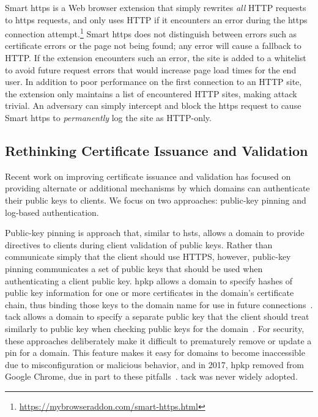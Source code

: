 Smart \ac{https} is a Web browser extension that simply rewrites \emph{all} HTTP
requests to \ac{https} requests, and only uses HTTP if it encounters an error
during the \ac{https} connection
attempt.\footnote{\url{https://mybrowseraddon.com/smart-https.html}} Smart
\ac{https} does not distinguish between errors such as certificate errors or the
page not being found; any error will cause a fallback to HTTP. If the extension
encounters such an error, the site is added to a whitelist to avoid future
request errors that would increase page load times for the end user. In addition
to poor performance on the first connection to an HTTP site, the extension only
maintains a list of encountered HTTP sites, making  attack trivial. An
adversary can simply intercept and block the \ac{https} request to cause Smart
\ac{https} to \emph{permanently} log the site as HTTP-only.

\subsection{Rethinking Certificate Issuance and Validation}

Recent work on improving certificate issuance and validation has focused on
providing alternate or additional mechanisms by which domains can authenticate
their public keys to clients. We focus on two approaches: public-key pinning and
log-based authentication.

Public-key pinning is  approach that, similar to \ac{hsts}, allows a
domain to provide directives to clients during client validation of public keys.
Rather than communicate simply that the client should use HTTPS, however,
public-key pinning communicates a set of public keys that should be used when
authenticating a client public key. \ac{hpkp} allows a domain to specify hashes
of public key information for one or more certificates in the domain's
certificate chain, thus binding those keys to the domain name for use in future
connections~\cite{rfc7469}. \ac{tack} allows a domain to specify a separate
public key that the client should treat similarly to  public key when
checking public keys for the domain~\cite{marlinspike2013trust}. For security,
these approaches deliberately make it difficult to prematurely remove or update
a pin for a domain. This feature makes it easy for domains to become
inaccessible due to misconfiguration or malicious behavior, and in 2017,
\ac{hpkp} removed from Google Chrome, due in part to these
pitfalls~\cite{palmer2017intent}. \ac{tack} was never widely adopted.

